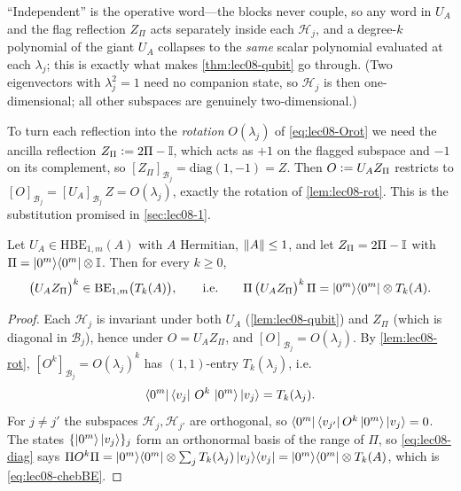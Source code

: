 ``Independent'' is the operative word---the blocks never couple, so any word in $U_A$ and
the flag reflection $Z_\Pi$ acts separately inside each $\mathcal H_j$, and a degree-$k$
polynomial of the giant $U_A$ collapses to the \emph{same} scalar polynomial evaluated at
each $\lambda_j$; this is exactly what makes \cref{thm:lec08-qubit} go through. (Two
eigenvectors with $\lambda_j^2=1$ need no companion state, so $\mathcal H_j$ is then
one-dimensional; all other subspaces are genuinely two-dimensional.)

To turn each reflection into the \emph{rotation} $O(\lambda_j)$ of
\eqref{eq:lec08-Orot} we need the ancilla reflection $Z_\Pi\vcentcolon=2\Pi-\mathbb{I}$, which
acts as $+1$ on the flagged subspace and $-1$ on its complement, so
$[Z_\Pi]_{\mathcal B_j}=\mathrm{diag}(1,-1)=Z$. Then $O\vcentcolon= U_A Z_\Pi$ restricts to
$[O]_{\mathcal B_j}=[U_A]_{\mathcal B_j}\,Z=O(\lambda_j)$, exactly the rotation of
\cref{lem:lec08-rot}. This is the substitution promised in \cref{sec:lec08-1}.

\begin{theorem}
\label{thm:lec08-qubit}
Let $U_A\in\mathrm{HBE}_{1,m}(A)$ with $A$ Hermitian, $\left\lVert A \right\rVert\le1$, and let
$Z_\Pi=2\Pi-\mathbb{I}$ with $\Pi=\ket{0^m}\!\bra{0^m}\otimes\mathbb{I}$. Then for every $k\ge0$,
\begin{equation}
  \bigl(U_A Z_\Pi\bigr)^k\in\mathrm{BE}_{1,m}\bigl(T_k(A)\bigr),
  \qquad\text{i.e.}\qquad
  \Pi\,\bigl(U_A Z_\Pi\bigr)^k\,\Pi=\ket{0^m}\!\bra{0^m}\otimes T_k(A).
  \label{eq:lec08-chebBE}
\end{equation}
\end{theorem}

\begin{proof}
Each $\mathcal H_j$ is invariant under both $U_A$ (\cref{lem:lec08-qubit}) and
$Z_\Pi$ (which is diagonal in $\mathcal B_j$), hence under $O=U_A Z_\Pi$, and
$[O]_{\mathcal B_j}=O(\lambda_j)$. By \cref{lem:lec08-rot},
$[O^k]_{\mathcal B_j}=O(\lambda_j)^k$ has $(1,1)$-entry $T_k(\lambda_j)$, i.e.\
\begin{equation}
  \bra{0^m}\bra{v_j}\,O^k\,\ket{0^m}\ket{v_j}=T_k(\lambda_j).
  \label{eq:lec08-diag}
\end{equation}
For $j\ne j'$ the subspaces $\mathcal H_j,\mathcal H_{j'}$ are orthogonal, so
$\bra{0^m}\bra{v_{j'}}O^k\ket{0^m}\ket{v_j}=0$. The states
$\{\ket{0^m}\ket{v_j}\}_j$ form an orthonormal basis of the range of $\Pi$, so
\eqref{eq:lec08-diag} says $\Pi O^k\Pi=\ket{0^m}\!\bra{0^m}\otimes\sum_j
T_k(\lambda_j)\ket{v_j}\!\bra{v_j}=\ket{0^m}\!\bra{0^m}\otimes T_k(A)$, which is
\eqref{eq:lec08-chebBE}.
\end{proof}

